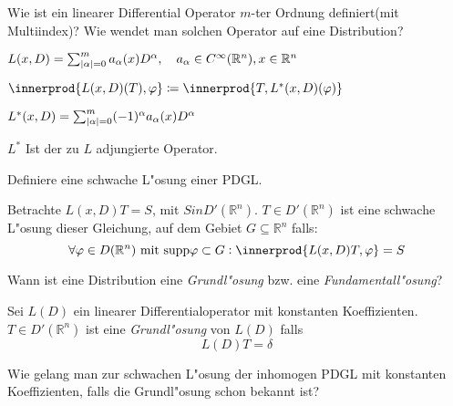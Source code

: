 \documentclass[9pt]{article}
\newcommand{\Rn}{\mathbb{R}^n}
\DeclarePairedDelimiter{\innerprod}\langle\rangle
\newenvironment{field}{}{\newpage}
\newif\ifnote
\newenvironment{note}{\notetrue}{\notefalse}
\newcommand{\localtag}{}
\newcommand{\globaltag}{}
\newcommand{\uuid}{}
\newcommand{\tags}[1]{
    \ifnote 
        \renewcommand{\localtag}{#1}
    \else
        \renewcommand{\globaltag}{#1}
    \fi 
    }
\newcommand{\xplain}[1]{\renewcommand{\uuid}{#1}}
\begin{document}
		\begin{note}
			\xplain{63f4f833-aa94-4650-9ef8-d3f0efcb71fc}
			\tags{}
			
			\begin{field}  %
				Wie ist ein linearer Differential Operator $m$-ter Ordnung definiert(mit Multiindex)?
				Wie wendet man solchen Operator auf eine Distribution?
			\end{field}
			
			\begin{field}  %
				$L(x,D) = \sum_{\abs{\alpha}=0}^m a_\alpha(x)D^\alpha, \quad a_\alpha \in C^\infty(\Rn), x\in\Rn$
					
				$\innerprod{L(x,D)(T), \varphi} \coloneqq \innerprod{T, L^*(x,D)(\varphi)}$
				
				$L^*(x,D) = \sum_{\abs{\alpha}=0}^m (-1)^\alpha a_\alpha(x)D^\alpha$
				
				$L^*$ Ist der zu $L$ adjungierte Operator. 
			\end{field}
			
		\begin{field}  %
			Definiere eine schwache L"osung einer PDGL.
		\end{field}
		
		\begin{field}  %
			Betrachte $L(x,D)T =S$, mit $S in D'(\Rn)$. $T\in D'(\Rn)$ ist eine schwache L"osung dieser Gleichung, auf dem Gebiet $G\subseteq \Rn$ falls:
			\begin{equation*}
				\forall \varphi \in D(\Rn) \text{ mit } \text{supp}\varphi \subset G:
				\innerprod{L(x,D)T,\varphi} = S
			\end{equation*}
		\end{field}
			
		\begin{field}  %
			Wann ist eine Distribution eine \textit{Grundl"osung} bzw. eine \textit{Fundamentall"osung}?
		\end{field}
		
		\begin{field}  %
			Sei $L(D)$ ein linearer Differentialoperator mit konstanten Koeffizienten.
			$T\in D'(\Rn)$ ist eine \textit{Grundl"osung} von $L(D)$ falls
			\begin{equation*}
				L(D)T = \delta
			\end{equation*}
		\end{field}
			
		\begin{field}  %
			Wie gelang man zur schwachen L"osung der inhomogen PDGL mit konstanten Koeffizienten, falls die Grundl"osung schon bekannt ist?
		\end{field}
		

\end{note}
\end{document}
